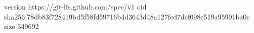 version https://git-lfs.github.com/spec/v1
oid sha256:78db83f728419bd5f58fd59716b4d3643d48a127fed7def098e519a95991ba0c
size 349692
